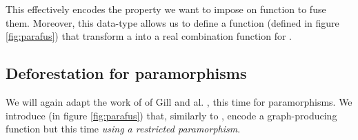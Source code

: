 This effectively encodes the property we want to impose on function to fuse them. Moreover, this data-type allows us to define a function  (defined in figure \ref{fig:parafus}) that transform a  into a real combination function for .

\subsection{Deforestation for paramorphisms}
\label{sec:defor-para}

We will again adapt the work of of Gill and al. \cite{Gill:1993:SCD:165180.165214}, this time for paramorphisms. We introduce  (in figure \ref{fig:parafus}) that, similarly to , encode a graph-producing function but this time \emph{using a restricted paramorphism}.

